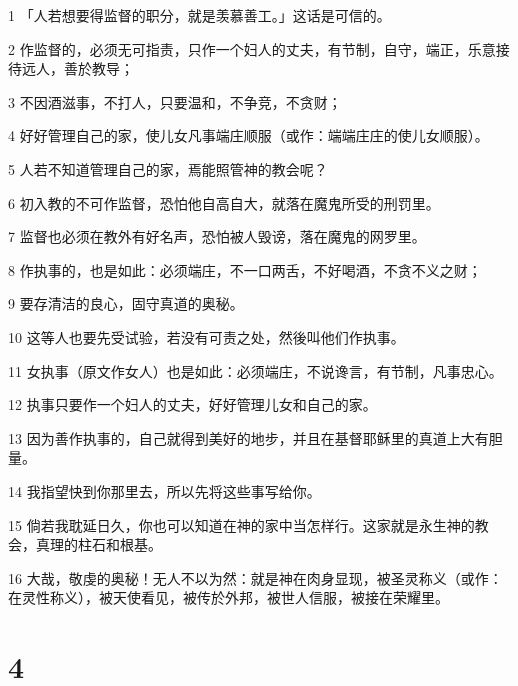 \par 1 「人若想要得监督的职分，就是羡慕善工。」这话是可信的。
\par 2 作监督的，必须无可指责，只作一个妇人的丈夫，有节制，自守，端正，乐意接待远人，善於教导；
\par 3 不因酒滋事，不打人，只要温和，不争竞，不贪财；
\par 4 好好管理自己的家，使儿女凡事端庄顺服（或作：端端庄庄的使儿女顺服）。
\par 5 人若不知道管理自己的家，焉能照管神的教会呢？
\par 6 初入教的不可作监督，恐怕他自高自大，就落在魔鬼所受的刑罚里。
\par 7 监督也必须在教外有好名声，恐怕被人毁谤，落在魔鬼的网罗里。
\par 8 作执事的，也是如此：必须端庄，不一口两舌，不好喝酒，不贪不义之财；
\par 9 要存清洁的良心，固守真道的奥秘。
\par 10 这等人也要先受试验，若没有可责之处，然後叫他们作执事。
\par 11 女执事（原文作女人）也是如此：必须端庄，不说谗言，有节制，凡事忠心。
\par 12 执事只要作一个妇人的丈夫，好好管理儿女和自己的家。
\par 13 因为善作执事的，自己就得到美好的地步，并且在基督耶稣里的真道上大有胆量。
\par 14 我指望快到你那里去，所以先将这些事写给你。
\par 15 倘若我耽延日久，你也可以知道在神的家中当怎样行。这家就是永生神的教会，真理的柱石和根基。
\par 16 大哉，敬虔的奥秘！无人不以为然：就是神在肉身显现，被圣灵称义（或作：在灵性称义），被天使看见，被传於外邦，被世人信服，被接在荣耀里。

\chapter{4}

